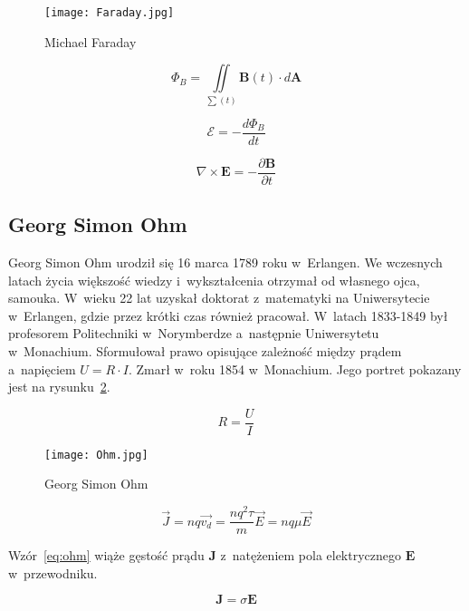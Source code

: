 \begin{figure}[!ht]
	\centering \texttt{[image: Faraday.jpg]}
	\caption{Michael Faraday}
	\label{rys:faraday}
\end{figure}

\begin{equation*}
    \Phi_B = \iint\limits_{\sum (t)} \pmb{B}(t) \cdot d\pmb{A}
\end{equation*}

\begin{equation}
    \mathcal{E} = -\frac{d\Phi_B}{dt}
\end{equation}

 \begin{equation}
     \nabla \times \pmb{E} = - \frac{\partial \pmb{B}}{\partial t}
 \end{equation}


\subsection{Georg Simon Ohm}
Georg Simon Ohm urodził się 16 marca 1789 roku w~Erlangen. We wczesnych latach życia większość wiedzy i~wykształcenia otrzymał od własnego ojca, samouka. W~wieku 22 lat uzyskał doktorat z~matematyki na Uniwersytecie w~Erlangen, gdzie przez krótki czas również pracował. W~latach 1833-1849 był profesorem Politechniki w~Norymberdze a~następnie Uniwersytetu w~Monachium. Sformułował prawo opisujące zależność między prądem a~napięciem $U=R \cdot I$. Zmarł w~roku 1854 w~Monachium. Jego portret pokazany jest na rysunku~\ref{rys:ohm}.

\begin{equation}
    R = \frac{U}{I}
\end{equation}

\begin{figure}[!h]
	\centering \texttt{[image: Ohm.jpg]}
	\caption{Georg Simon Ohm}
	\label{rys:ohm}
\end{figure}

\begin{equation*}
    \vec{J} = nq \vec{v_d} =  \frac{nq^2 \tau}{m} \vec{E} = nq \mu \vec{E}    
\end{equation*}
 
Wzór~\ref{eq:ohm} wiąże gęstość prądu $\pmb{J}$ z~natężeniem pola elektrycznego $\pmb{E}$ w~przewodniku.
 
\begin{equation}
    \pmb{J} = \sigma \pmb{E}
    \label{eq:ohm}
\end{equation}


